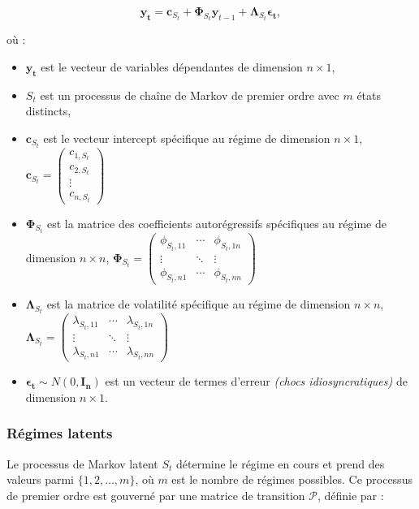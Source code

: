 \begin{sloppypar}
\begin{equation}
    \bm{y_t} = \bm{c}_{S_t} + \bm{\Phi}_{S_t} \bm{y}_{t-1} + \bm{\Lambda}_{S_t} \bm{\epsilon_t},
\end{equation}

où :
\begin{itemize}
    \item $\bm{y_t}$ est le vecteur de variables dépendantes de dimension $n \times 1$,
    \item $S_t$ est un processus de chaîne de Markov de premier ordre avec $m$ états distincts,
    \item $\bm{c}_{S_t}$ est le vecteur intercept spécifique au régime de dimension $n \times 1$, $ \bm{c}_{S_t} = \begin{pmatrix} 
c_{1, S_t} \\
c_{2, S_t} \\
\vdots \\
c_{n, S_t} 
\end{pmatrix}$
    \item $\bm{\Phi}_{S_t}$ est la matrice des coefficients autorégressifs spécifiques au régime de dimension $n \times n$, $\bm{\Phi}_{S_t} = 
    \begin{pmatrix}
        \phi_{S_t,11} & \cdots & \phi_{S_t,1n} \\
        \vdots & \ddots & \vdots \\
        \phi_{S_t,n1} & \cdots & \phi_{S_t,nn}
    \end{pmatrix}$
    \item $\bm{\Lambda}_{S_t}$ est la matrice de volatilité spécifique au régime de dimension $n \times n$,\\ $\bm{\Lambda}_{S_t} = 
    \begin{pmatrix}
        \lambda_{S_t,11} & \cdots & \lambda_{S_t,1n} \\
        \vdots & \ddots & \vdots \\
        \lambda_{S_t,n1} & \cdots & \lambda_{S_t,nn}
    \end{pmatrix}$
    \item $\bm{\epsilon_t} \sim N(0, \bm{I_n})$ est un vecteur de termes d'erreur \textit{(chocs idiosyncratiques)} de dimension $n \times 1$.
\end{itemize}

\subsubsection{Régimes latents}

Le processus de Markov latent \( S_t \) détermine le régime en cours et prend des valeurs parmi \(\{1, 2, \dots, m\}\), où \( m \) est le nombre de régimes possibles. Ce processus de premier ordre est gouverné par une matrice de transition \( \mathcal{P} \), définie par :


\end{sloppypar}
